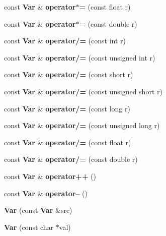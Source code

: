 \begin{CompactItemize}
\item 
const {\bf Var} \& \textbf{operator$\ast$=} (const float r)\label{classVar_0175d9191ad7cb0dbc34dc0ffdaf8e32}

\item 
const {\bf Var} \& \textbf{operator$\ast$=} (const double r)\label{classVar_5910b0b92187e3c78a2d49dc622b9a6c}

\item 
const {\bf Var} \& \textbf{operator/=} (const int r)\label{classVar_c63be27f3de4c4fe6b0c9e3bab91acca}

\item 
const {\bf Var} \& \textbf{operator/=} (const unsigned int r)\label{classVar_488d18235ef01a5f2e61b43f7dce35c6}

\item 
const {\bf Var} \& \textbf{operator/=} (const short r)\label{classVar_b02ce884f553cd6c7bb88af8a0483213}

\item 
const {\bf Var} \& \textbf{operator/=} (const unsigned short r)\label{classVar_f9640fe881fc4ba52db75c4f052060a4}

\item 
const {\bf Var} \& \textbf{operator/=} (const long r)\label{classVar_1ac4544a432386b94f23ab7c23e811b8}

\item 
const {\bf Var} \& \textbf{operator/=} (const unsigned long r)\label{classVar_debf5a66db6616c14f0ad38018941609}

\item 
const {\bf Var} \& \textbf{operator/=} (const float r)\label{classVar_62a0df010f34125f7b91763b64a262d0}

\item 
const {\bf Var} \& \textbf{operator/=} (const double r)\label{classVar_e4c8a2a99853f502becc2eed4f597f5a}

\item 
const {\bf Var} \& \textbf{operator++} ()\label{classVar_b5a22d57926e2f433c2e9548485f8ea7}

\item 
const {\bf Var} \& \textbf{operator--} ()\label{classVar_36b15e3d265ce507d72ad7f1a5b1415d}

\item 
\textbf{Var} (const {\bf Var} \&src)\label{classVar_2454843f8e59c8275dc4bf317bd83107}

\item 
\textbf{Var} (const char $\ast$val)\label{classVar_54b7b0c0eaea765b9ab5d4589f7e882d}


\end{CompactItemize}
